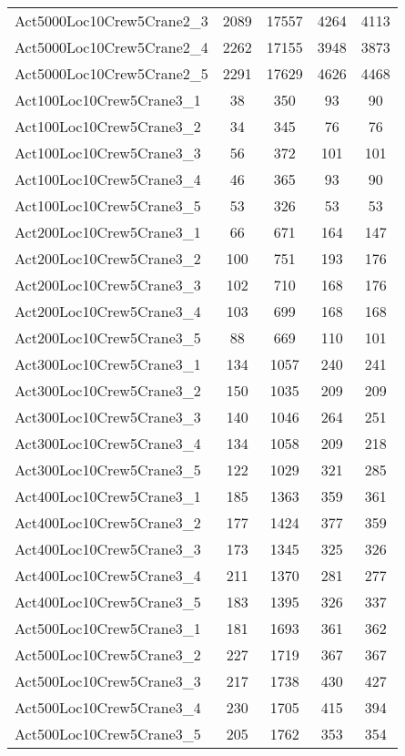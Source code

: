\begin{center}
\begin{longtable}{ | l | c | c | c | c | }
Act5000Loc10Crew5Crane2\_3	&	2089	&	17557	&	4264	&	4113	\\
Act5000Loc10Crew5Crane2\_4	&	2262	&	17155	&	3948	&	3873	\\
Act5000Loc10Crew5Crane2\_5	&	2291	&	17629	&	4626	&	4468	\\ \hline
Act100Loc10Crew5Crane3\_1	&	38	&	350	&	93	&	90	\\
Act100Loc10Crew5Crane3\_2	&	34	&	345	&	76	&	76	\\
Act100Loc10Crew5Crane3\_3	&	56	&	372	&	101	&	101	\\
Act100Loc10Crew5Crane3\_4	&	46	&	365	&	93	&	90	\\
Act100Loc10Crew5Crane3\_5	&	53	&	326	&	53	&	53	\\
Act200Loc10Crew5Crane3\_1	&	66	&	671	&	164	&	147	\\
Act200Loc10Crew5Crane3\_2	&	100	&	751	&	193	&	176	\\
Act200Loc10Crew5Crane3\_3	&	102	&	710	&	168	&	176	\\
Act200Loc10Crew5Crane3\_4	&	103	&	699	&	168	&	168	\\
Act200Loc10Crew5Crane3\_5	&	88	&	669	&	110	&	101	\\
Act300Loc10Crew5Crane3\_1	&	134	&	1057	&	240	&	241	\\
Act300Loc10Crew5Crane3\_2	&	150	&	1035	&	209	&	209	\\
Act300Loc10Crew5Crane3\_3	&	140	&	1046	&	264	&	251	\\
Act300Loc10Crew5Crane3\_4	&	134	&	1058	&	209	&	218	\\
Act300Loc10Crew5Crane3\_5	&	122	&	1029	&	321	&	285	\\
Act400Loc10Crew5Crane3\_1	&	185	&	1363	&	359	&	361	\\
Act400Loc10Crew5Crane3\_2	&	177	&	1424	&	377	&	359	\\
Act400Loc10Crew5Crane3\_3	&	173	&	1345	&	325	&	326	\\
Act400Loc10Crew5Crane3\_4	&	211	&	1370	&	281	&	277	\\
Act400Loc10Crew5Crane3\_5	&	183	&	1395	&	326	&	337	\\
Act500Loc10Crew5Crane3\_1	&	181	&	1693	&	361	&	362	\\
Act500Loc10Crew5Crane3\_2	&	227	&	1719	&	367	&	367	\\
Act500Loc10Crew5Crane3\_3	&	217	&	1738	&	430	&	427	\\
Act500Loc10Crew5Crane3\_4	&	230	&	1705	&	415	&	394	\\
Act500Loc10Crew5Crane3\_5	&	205	&	1762	&	353	&	354	\\

\end{longtable}
\end{center}
